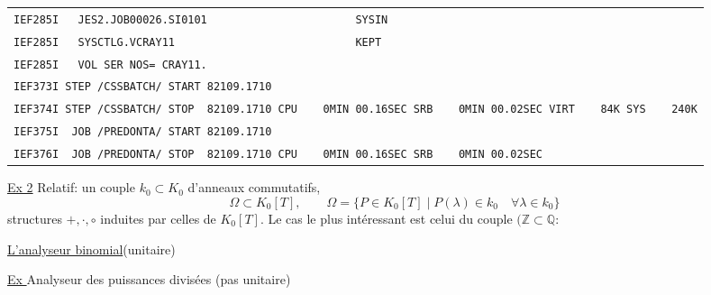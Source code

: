\begin{tabular}{l}
\texttt{IEF285I\ \ \ JES2.JOB00026.SI0101\ \ \ \ \ \ \ \ \ \ \ \ \ \ \ \ \ \ \ \ \ \ \ SYSIN} \\
\texttt{IEF285I\ \ \ SYSCTLG.VCRAY11\ \ \ \ \ \ \ \ \ \ \ \ \ \ \ \ \ \ \ \ \ \ \ \ \ \ \ \ KEPT} \\
\texttt{IEF285I\ \ \ VOL\ SER\ NOS=\ CRAY11.} \\
\texttt{IEF373I\ STEP\ /CSSBATCH/\ START\ 82109.1710} \\
\texttt{IEF374I\ STEP\ /CSSBATCH/\ STOP\ \ 82109.1710\ CPU\ \ \ \ 0MIN\ 00.16SEC\ SRB\ \ \ \ 0MIN\ 00.02SEC\ VIRT\ \ \ \ 84K\ SYS\ \ \ \ 240K} \\
\texttt{IEF375I\ \ JOB\ /PREDONTA/\ START\ 82109.1710} \\
\texttt{IEF376I\ \ JOB\ /PREDONTA/\ STOP\ \ 82109.1710\ CPU\ \ \ \ 0MIN\ 00.16SEC\ SRB\ \ \ \ 0MIN\ 00.02SEC}
\end{tabular}

\uline{Ex 2} Relatif: un couple $k_0\subset K_0$ d'anneaux commutatifs,
\[
\Omega\subset K_0[T],\qquad
\Omega=\{P\in K_0[T]\mid P(\lambda)\in k_0\quad\forall\lambda\in k_0\}
\]
structures $+,\cdot,\circ$ induites par celles de $K_0[T]$.
Le cas le plus intéressant est celui du couple $(\mathbb Z\subset\mathbb Q$:

\uline{L'analyseur binomial}\qquad (unitaire)


\uline{Ex }\quad Analyseur des puissances divisées (pas unitaire)

